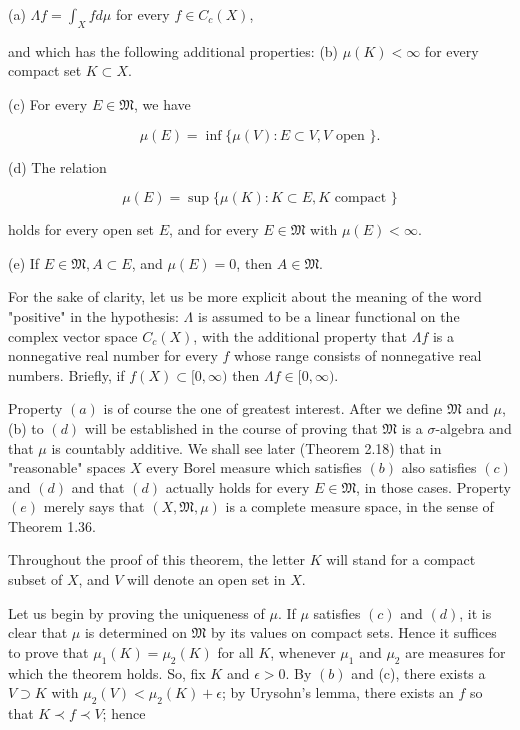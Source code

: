 \documentclass[10pt]{article}
\begin{document}
(a) $\Lambda f=\int_{X} f d \mu$ for every $f \in C_{c}(X)$,

and which has the following additional properties:
(b) $\mu(K)<\infty$ for every compact set $K \subset X$.

(c) For every $E \in \mathfrak{M}$, we have

$$
\mu(E)=\inf \{\mu(V): E \subset V, V \text { open }\} .
$$

(d) The relation

$$
\mu(E)=\sup \{\mu(K): K \subset E, K \text { compact }\}
$$

holds for every open set $E$, and for every $E \in \mathfrak{M}$ with $\mu(E)<\infty$.

(e) If $E \in \mathfrak{M}, A \subset E$, and $\mu(E)=0$, then $A \in \mathfrak{M}$.

For the sake of clarity, let us be more explicit about the meaning of the word "positive" in the hypothesis: $\Lambda$ is assumed to be a linear functional on the complex vector space $C_{c}(X)$, with the additional property that $\Lambda f$ is a nonnegative real number for every $f$ whose range consists of nonnegative real numbers. Briefly, if $f(X) \subset[0, \infty)$ then $\Lambda f \in[0, \infty)$.

Property $(a)$ is of course the one of greatest interest. After we define $\mathfrak{M}$ and $\mu$, (b) to $(d)$ will be established in the course of proving that $\mathfrak{M}$ is a $\sigma$-algebra and that $\mu$ is countably additive. We shall see later (Theorem 2.18) that in "reasonable" spaces $X$ every Borel measure which satisfies $(b)$ also satisfies $(c)$ and $(d)$ and that $(d)$ actually holds for every $E \in \mathfrak{M}$, in those cases. Property $(e)$ merely says that $(X, \mathfrak{M}, \mu)$ is a complete measure space, in the sense of Theorem 1.36.

Throughout the proof of this theorem, the letter $K$ will stand for a compact subset of $X$, and $V$ will denote an open set in $X$.

Let us begin by proving the uniqueness of $\mu$. If $\mu$ satisfies $(c)$ and $(d)$, it is clear that $\mu$ is determined on $\mathfrak{M}$ by its values on compact sets. Hence it suffices to prove that $\mu_{1}(K)=\mu_{2}(K)$ for all $K$, whenever $\mu_{1}$ and $\mu_{2}$ are measures for which the theorem holds. So, fix $K$ and $\epsilon>0$. By $(b)$ and (c), there exists a $V \supset K$ with $\mu_{2}(V)<\mu_{2}(K)+\epsilon$; by Urysohn's lemma, there exists an $f$ so that $K \prec f \prec V$; hence
\end{document}
